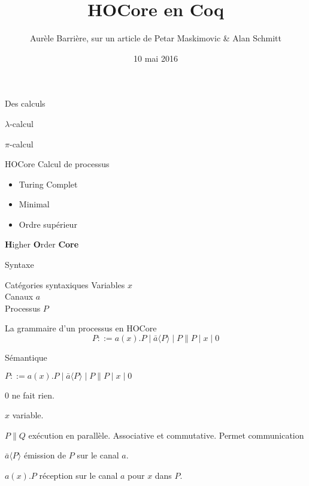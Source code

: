 \documentclass{beamer}
\title{HOCore en Coq}
\date{10 mai 2016}
\author{Aurèle Barrière, sur un article de Petar Maskimovic \& Alan Schmitt}
\begin{document}
\begin{frame}
\maketitle
\end{frame}

\begin{frame}{Des calculs}
\begin{block}{$\lambda$-calcul}
\end{block}
\begin{block}{$\pi$-calcul}
\end{block}
\end{frame}


\begin{frame}{HOCore}
Calcul de processus

\begin{itemize}
\item Turing Complet
\item Minimal
\item Ordre supérieur
\end{itemize}

\textbf{H}igher \textbf{O}rder \textbf{Core}
\end{frame}

\begin{frame}{Syntaxe}
\begin{block}{Catégories syntaxiques}
Variables $x$\\
Canaux $a$\\
Processus $P$
\end{block}

La grammaire d'un processus en HOCore
$$ P ::= a(x).P \mid \bar{a}\langle P\rangle \mid P\|P \mid x \mid 0 $$

\end{frame}

\begin{frame}{Sémantique}

\begin{alertblock}{}
$ P ::= a(x).P \mid \bar{a}\langle P\rangle \mid P\|P \mid x \mid 0 $
\end{alertblock}


$0$ ne fait rien.

$x$ variable.

$P\|Q$ exécution en parallèle. Associative et commutative. Permet communication

$\bar{a}\langle P\rangle$ émission de $P$ sur le canal $a$.

$a(x).P$ réception sur le canal $a$ pour $x$ dans $P$.

\end{frame}
\end{document}
